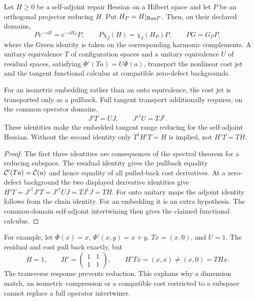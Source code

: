 \documentclass[11pt,a4paper]{article}
\begin{document}
\begin{theorem}
\label{thm:projection-calculus}
Let \(H\geq0\) be a self-adjoint repair Hessian on a Hilbert space and let
\(P\) be an orthogonal projector reducing \(H\).  Put
\(H_P=H|_{\mathrm{Ran} P}\).  Then, on their declared domains,
\begin{equation}
Pe^{-sH}=e^{-sH_P}P,
\qquad
P\chi_I(H)=\chi_I(H_P)P,
\qquad
PG=G_PP,
\label{eq:functional-intertwining}
\end{equation}
where the Green identity is taken on the corresponding harmonic
complements. A unitary equivalence \(T\) of configuration spaces and a
unitary equivalence \(U\) of residual spaces, satisfying
\(\Phi'(Ta)=U\Phi(a)\), transport the nonlinear cost jet and the tangent
functional calculus at compatible zero-defect backgrounds.

For an isometric embedding rather than an onto equivalence, the cost jet
is transported only as a pullback. Full tangent transport additionally
requires, on the common operator domains,
\[
J'T=UJ,\qquad J'^\dagger U=TJ^\dagger.
\]
These identities make the embedded tangent range reducing for the
self-adjoint Hessian. Without the second identity only
\(T^\dagger H'T=H\) is implied, not \(H'T=TH\).
\end{theorem}

\begin{proof}
The first three identities are consequences of the spectral theorem for a
reducing subspace. The residual identity gives the pullback equality
\(\mathcal{C}'(Ta)=\mathcal{C}(a)\) and hence equality of all pulled-back cost
derivatives. At a zero-defect background the two displayed derivative
identities give
\(H'T=J'^\dagger J'T=J'^\dagger UJ=TJ^\dagger J=TH\).
For onto unitary maps the adjoint identity follows from the chain identity.
For an embedding it is an extra hypothesis. The common-domain self-adjoint
intertwining then gives the claimed functional calculus.
\end{proof}

For example, let \(\Phi(x)=x\), \(\Phi'(x,y)=x+y\),
\(Tx=(x,0)\), and \(U=1\). The residual and cost pull back exactly, but
\[
H=1,\qquad H'=\begin{pmatrix}1&1\\1&1\end{pmatrix},\qquad
H'Tx=(x,x)\ne(x,0)=THx .
\]
The transverse response prevents reduction. This explains why a
dimension match, an isometric compression or a compatible cost restricted
to a subspace cannot replace a full operator intertwiner.
\end{document}
